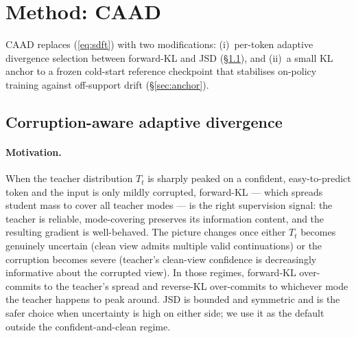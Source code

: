 \documentclass{article}
\newcommand{\caad}{\textsc{CAAD}}
\begin{document}
\section{Method: \caad{}}
\label{sec:method}

\caad{} replaces (\ref{eq:sdft}) with two modifications: (i)~per-token adaptive divergence selection between forward-KL and JSD (\S\ref{sec:caad}), and (ii)~a small KL anchor to a frozen cold-start reference checkpoint that stabilises on-policy training against off-support drift (\S\ref{sec:anchor}).

\subsection{Corruption-aware adaptive divergence}
\label{sec:caad}

\paragraph{Motivation.}
When the teacher distribution $T_t$ is sharply peaked on a confident, easy-to-predict token and the input is only mildly corrupted, forward-KL --- which spreads student mass to cover all teacher modes --- is the right supervision signal: the teacher is reliable, mode-covering preserves its information content, and the resulting gradient is well-behaved. The picture changes once either $T_t$ becomes genuinely uncertain (clean view admits multiple valid continuations) or the corruption becomes severe (teacher's clean-view confidence is decreasingly informative about the corrupted view). In those regimes, forward-KL over-commits to the teacher's spread and reverse-KL over-commits to whichever mode the teacher happens to peak around. JSD is bounded and symmetric and is the safer choice when uncertainty is high on either side; we use it as the default outside the confident-and-clean regime.
\end{document}
